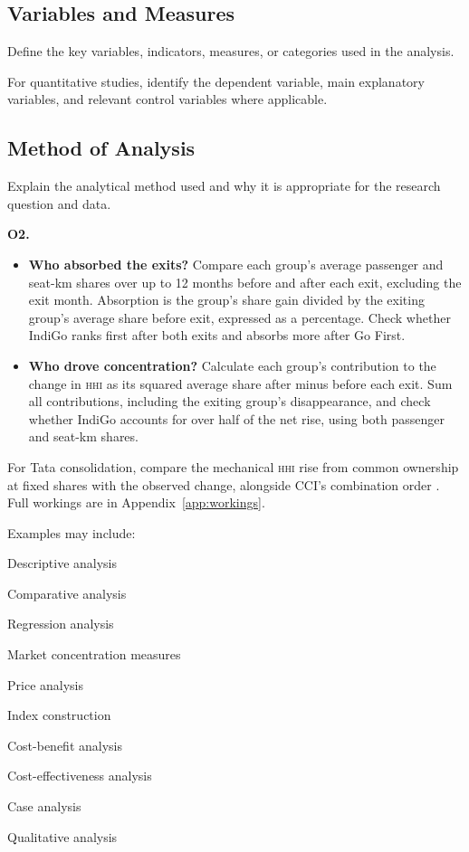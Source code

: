 \documentclass[12pt,a4paper]{article}
\newcommand{\HHI}{\textnormal{\textsc{hhi}}}
\newenvironment{mycontribution}{\par\color{blue}\captionsetup{font+={color=blue}}}{\par}
\newcommand{\templatebullet}[1]{\par\noindent\textbullet\hspace{5.88pt}#1\par}
\begin{document}
\subsection{Variables and Measures}
Define the key variables, indicators, measures, or categories used in the analysis.

For quantitative studies, identify the dependent variable, main explanatory variables, and relevant control variables where applicable.

\subsection{Method of Analysis}
Explain the analytical method used and why it is appropriate for the research question and data.

\begin{mycontribution}
\textbf{O2.}
\begin{itemize}[leftmargin=2em]
	\item \textbf{Who absorbed the exits?} Compare each group's average passenger and seat-km shares over up to 12 months before and after each exit, excluding the exit month. Absorption is the group's share gain divided by the exiting group's average share before exit, expressed as a percentage. Check whether IndiGo ranks first after both exits and absorbs more after Go First.
	\item \textbf{Who drove concentration?} Calculate each group's contribution to the change in \HHI{} as its squared average share after minus before each exit. Sum all contributions, including the exiting group's disappearance, and check whether IndiGo accounts for over half of the net rise, using both passenger and seat-km shares.
\end{itemize}
For Tata consolidation, compare the mechanical \HHI{} rise from common ownership at fixed shares with the observed change, alongside CCI's combination order \parencite{cci2023vistara}. Full workings are in Appendix~\ref{app:workings}.
\end{mycontribution}

Examples may include:
\templatebullet{Descriptive analysis}
\templatebullet{Comparative analysis}
\templatebullet{Regression analysis}
\templatebullet{Market concentration measures}
\templatebullet{Price analysis}
\templatebullet{Index construction}
\templatebullet{Cost-benefit analysis}
\templatebullet{Cost-effectiveness analysis}
\templatebullet{Case analysis}
\templatebullet{Qualitative analysis}
\end{document}
